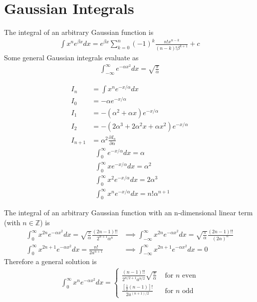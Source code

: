 \section{Gaussian Integrals}
The integral of an arbitrary Gaussian function is
\begin{align}
\int x^ne^{\beta x} dx = e^{\beta x}\sum_{k=0}^{n}(-1)^k\frac{n!x^{n-k}}{(n-k)!\beta^{k+1}}+c
\end{align}
Some general Gaussian integrals evaluate as
\begin{align}
\int_{-\infty}^{\infty} e^{-\alpha x^2} dx = \sqrt{\frac{\pi}{\alpha}} 
\end{align}
\begin{multicols}{2}
	\noindent
\begin{align}
I_n&=\int x^ne^{-x/\alpha}dx \\
I_0&= -\alpha e^{-x/\alpha} \\
I_1&= -(\alpha^2+\alpha x) e^{-x/\alpha} \\
I_2&= -(2\alpha^3+2\alpha^2 x+\alpha x^2) e^{-x/\alpha} \\
I_{n+1}&=\alpha^2\frac{\partial  I_n}{\partial \alpha} 
\end{align}
\begin{align}
&\int_{0}^{\infty}e^{-x/\alpha}dx = \alpha \\
&\int_{0}^{\infty}xe^{-x/\alpha}dx = \alpha^2 \\
&\int_{0}^{\infty}x^2e^{-x/\alpha}dx = 2\alpha^3 \\
&\int_{0}^{\infty}x^ne^{-x/\alpha}dx = n!\alpha^{n+1}
\end{align}
\end{multicols}
The integral of an arbitrary Gaussian function with an n-dimensional linear term (with $n \in \mathbb{Z}$) is
\begin{align}
\int_{0}^{\infty}x^{2n}e^{-\alpha x^2}dx = \sqrt{\frac{\pi}{\alpha}}\frac{(2n-1)!!}{2^{n+1}\alpha^n} &\implies  \int_{-\infty}^{\infty}x^{2n}e^{-\alpha x^2}dx = \sqrt{\frac{\pi}{\alpha}}\frac{(2n-1)!!}{(2\alpha)^n}\\
\int_{0}^{\infty}x^{2n+1}e^{-\alpha x^2}dx = \frac{n!}{2a^{n+1}} &\implies \int_{-\infty}^{\infty}x^{2n+1}e^{-\alpha x^2}dx = 0
\end{align}
Therefore a general solution is
\begin{align}
\int_{0}^{\infty}x^ne^{-\alpha x^2}dx = 
\begin{cases}
\displaystyle
\frac{(n-1)!!}{2^{n/2+1}a^{n/2}}\sqrt{\frac{\pi}{\alpha}} & \textrm{ for $n$ even} \\
\displaystyle
\frac{[\frac{1}{2}(n-1)]!}{2a^{(n+1)/2}}& \textrm{ for $n$ odd} 
\end{cases}
\end{align}

